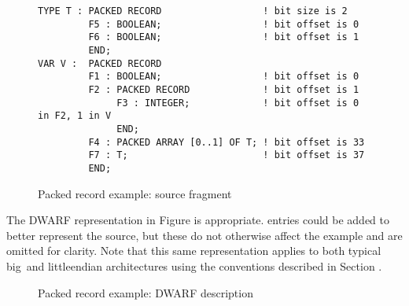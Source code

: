 \begin{figure}[here]
\begin{lstlisting}
TYPE T : PACKED RECORD                  ! bit size is 2
         F5 : BOOLEAN;                  ! bit offset is 0
         F6 : BOOLEAN;                  ! bit offset is 1
         END;
VAR V :  PACKED RECORD
         F1 : BOOLEAN;                  ! bit offset is 0
         F2 : PACKED RECORD             ! bit offset is 1
              F3 : INTEGER;             ! bit offset is 0 in F2, 1 in V
              END;
         F4 : PACKED ARRAY [0..1] OF T; ! bit offset is 33
         F7 : T;                        ! bit offset is 37
         END;
\end{lstlisting}
\caption{Packed record example: source fragment}
\label{fig:packedrecordexamplesourcefragment}
\end{figure}

The DWARF representation in 
Figure  
is appropriate. 
\DWTAGpackedtype{} entries could be added to
better represent the source, but these do not otherwise affect
the example and are omitted for clarity. Note that this same
representation applies to both typical big\dash \ and 
little\dash endian
architectures using the conventions described in 
Section .

\begin{figure}[h]
\caption{Packed record example: DWARF description}
\label{fig:packedrecordexampledwarfdescription}
\end{figure}

